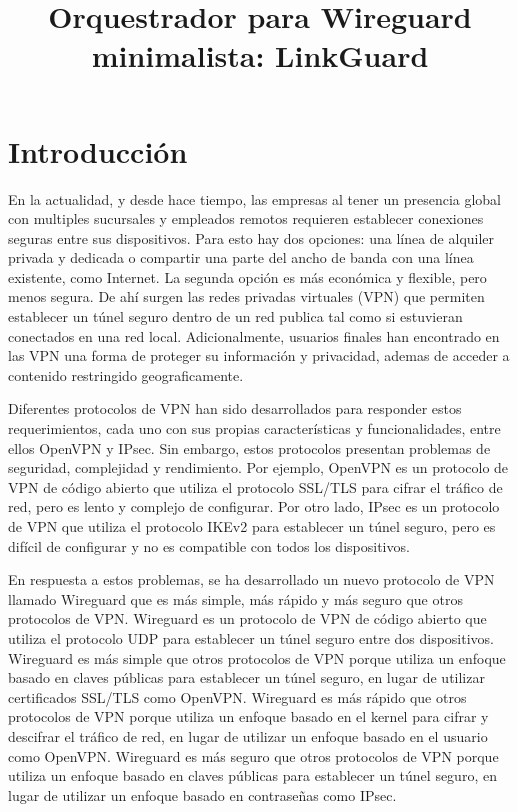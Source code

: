 \documentclass{article}
\title{Orquestrador para Wireguard minimalista: LinkGuard}
\begin{document}
\maketitle


\section{Introducción}

En la actualidad, y desde hace tiempo, las empresas al tener un presencia global con multiples sucursales y empleados remotos requieren establecer conexiones seguras entre sus dispositivos. Para esto hay dos opciones: una línea de alquiler privada y dedicada o compartir una parte del ancho de banda con una línea existente, como Internet. La segunda opción es más económica y flexible, pero menos segura. De ahí surgen las redes privadas virtuales (VPN) que permiten establecer un túnel seguro dentro de un red publica tal como si estuvieran conectados en una red local. Adicionalmente, usuarios finales han encontrado en las VPN una forma de proteger su información y privacidad, ademas de acceder a contenido restringido geograficamente.


Diferentes protocolos de VPN han sido desarrollados para responder estos requerimientos, cada uno con sus propias características y funcionalidades, entre ellos OpenVPN y IPsec. Sin embargo, estos protocolos presentan problemas de seguridad, complejidad y rendimiento. Por ejemplo, OpenVPN es un protocolo de VPN de código abierto que utiliza el protocolo SSL/TLS para cifrar el tráfico de red, pero es lento y complejo de configurar. Por otro lado, IPsec es un protocolo de VPN que utiliza el protocolo IKEv2 para establecer un túnel seguro, pero es difícil de configurar y no es compatible con todos los dispositivos.

En respuesta a estos problemas, se ha desarrollado un nuevo protocolo de VPN llamado Wireguard que es más simple, más rápido y más seguro que otros protocolos de VPN. Wireguard es un protocolo de VPN de código abierto que utiliza el protocolo UDP para establecer un túnel seguro entre dos dispositivos. Wireguard es más simple que otros protocolos de VPN porque utiliza un enfoque basado en claves públicas para establecer un túnel seguro, en lugar de utilizar certificados SSL/TLS como OpenVPN. Wireguard es más rápido que otros protocolos de VPN porque utiliza un enfoque basado en el kernel para cifrar y descifrar el tráfico de red, en lugar de utilizar un enfoque basado en el usuario como OpenVPN. Wireguard es más seguro que otros protocolos de VPN porque utiliza un enfoque basado en claves públicas para establecer un túnel seguro, en lugar de utilizar un enfoque basado en contraseñas como IPsec.
\end{document}
